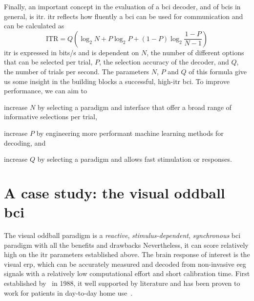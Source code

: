 Finally, an important concept in the evaluation of a \ac{bci} decoder, and of \acp{bci}
in general, is \ac{itr}.
\Ac{itr} reflects how fluently a \ac{bci} can be used for communication and can
be calculated as
\begin{equation}
	\text{ITR} = Q\left(\log_2N+P\log_2P+(1-P)\log_2\frac{1-P}{N-1}\right)
\end{equation}
\Ac{itr} is expressed in bits/s and is dependent on $N$, the number of
different options that can be selected per trial, $P$, the selection accuracy
of the decoder, and $Q$, the number of trials per second.
The parameters $N$, $P$ and $Q$ of this formula give us some insight in the
building blocks a successful, high-\ac{itr} \ac{bci}.
To improve performance, we can aim to
\begin{enumerate*}[label={\arabic*})]
\item increase $N$ by selecting a paradigm and interface that offer a
broad range of informative selections per trial,
\item increase $P$ by engineering more performant machine learning methods for
decoding, and
\item increase $Q$ by selecting a paradigm and allows fast stimulation or
responses.
\end{enumerate*}


\section{A case study: the visual oddball \ac{bci}}

The visual oddball paradigm is a \emph{reactive}, \emph{stimulus-dependent},
\emph{synchronous} \ac{bci} paradigm with all the benefits and drawbacks
Nevertheless, it can score relatively high on the \ac{itr} parameters established above.
The brain response of interest is the visual \ac{erp}, which can be accurately
measured and decoded from non-invasive \ac{eeg} signals with a relatively low
computational effort and short calibration time.
First established by~\cite{Farwell1988} in 1988, it well supported by literature
and has been proven to work for patients in day-to-day home
use~\cite{Wolpaw2018}.

